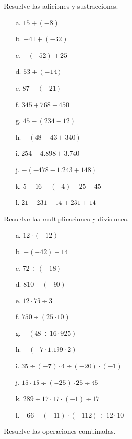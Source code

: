 \documentclass[spanish,letterpaper, 11pt, addpoints, answers]{exam}
\begin{document}
\begin{questions}

\question Resuelve las adiciones y sustracciones.
\begin{multicols}{2}

\begin{itemize}
  \item[a.] $15+(-8)$
  \item[b.] $-41+(-32)$
  \item[c.] $-(-52)+25$
  \item[d.] $53+(-14)$
  \item[e.] $87-(-21)$
  \item[f.] $345+768-450$
  \item[g.] $45-(234-12)$
  \item[h.] $-(48-43+340)$
  \item[i.] $254-4.898+3.740$
  \item[j.] $-(-478-1.243+148)$
  \item[k.] $5+16+(-4)+25-45$
  \item[l.] $21-231-14+231+14$
\end{itemize}
\end{multicols}

\question Resuelve las multiplicaciones y divisiones.
\begin{multicols}{2}
  

  \begin{itemize}
    \item[a.] $12\cdot(-12)$
    \item[b.] $-(-42)\div 14$
    \item[c.] $72\div (-18)$
    \item[d.] $810\div (-90)$
    \item[e.] $12\cdot 76\div 3$
    \item[f.] $750\div(25\cdot 10)$
    \item[g.] $-(48\div 16\cdot 925)$
    \item[h.] $-(-7\cdot 1.199\cdot 2)$
    \item[i.] $35\div (-7)\cdot 4\div (-20)\cdot (-1)$
    \item[j.] $15\cdot 15\div (-25)\cdot 25\div 45$
    \item[k.] $289\div 17\cdot 17\cdot (-1)\div 17$
    \item[l.] $-66\div (-11)\cdot (-112)\div 12\cdot 10$
  \end{itemize}
\end{multicols}

  \question Resuelve las operaciones combinadas.


\end{questions}
\end{document}
